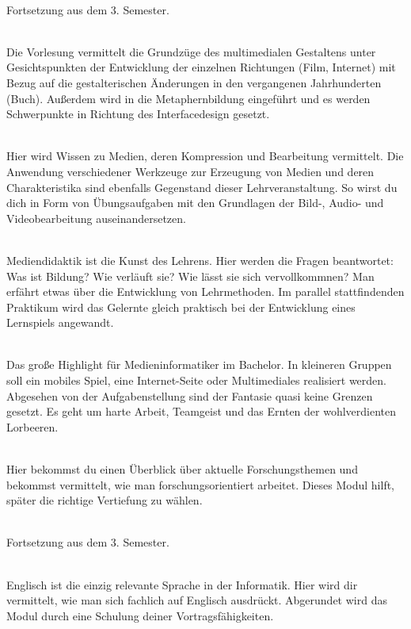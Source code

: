 \textbf{} \\
Fortsetzung aus dem 3. Semester.

\textbf{} \\
Die Vorlesung vermittelt die Grundzüge des multimedialen Gestaltens unter Gesichtspunkten der Entwicklung der einzelnen Richtungen (Film, Internet) mit Bezug auf die gestalterischen Änderungen in den vergangenen Jahrhunderten (Buch).
Außerdem wird in die Metaphernbildung eingeführt und es werden Schwerpunkte in Richtung des Interfacedesign gesetzt.

\textbf{} \\
Hier wird Wissen zu Medien, deren Kompression und Bearbeitung vermittelt.
Die Anwendung verschiedener Werkzeuge zur Erzeugung von Medien und deren Charakteristika sind ebenfalls Gegenstand dieser Lehrveranstaltung.
So wirst du dich in Form von Übungsaufgaben mit den Grundlagen der Bild-, Audio- und Videobearbeitung auseinandersetzen.

\textbf{} \\
Mediendidaktik ist die \glqq Kunst des Lehrens\grqq.
Hier werden die Fragen beantwortet:
Was ist Bildung?
Wie verläuft sie?
Wie lässt sie sich vervollkommnen?
Man erfährt etwas über die Entwicklung von Lehrmethoden.
Im parallel stattfindenden Praktikum wird das Gelernte gleich praktisch bei der Entwicklung eines Lernspiels angewandt.

\textbf{} \\
Das große Highlight für Medieninformatiker im Bachelor.
In kleineren Gruppen soll ein mobiles Spiel, eine Internet-Seite oder Multimediales realisiert werden.
Abgesehen von der Aufgabenstellung sind der Fantasie quasi keine Grenzen gesetzt.
Es geht um harte Arbeit, Teamgeist und das Ernten der wohlverdienten Lorbeeren.

\textbf{} \\
Hier bekommst du einen Überblick über aktuelle Forschungsthemen und bekommst vermittelt, wie man forschungsorientiert arbeitet.
Dieses Modul hilft, später die richtige Vertiefung zu wählen.

\textbf{} \\
Fortsetzung aus dem 3. Semester.

\textbf{} \\
Englisch ist die einzig relevante Sprache in der Informatik.
Hier wird dir vermittelt, wie man sich fachlich auf Englisch ausdrückt.
Abgerundet wird das Modul durch eine Schulung deiner Vortragsfähigkeiten.


